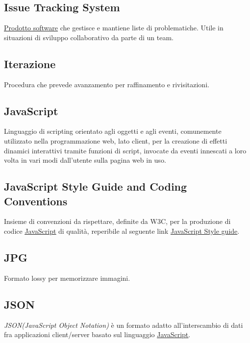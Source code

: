	\subsection{Issue Tracking System}
	\label{sec:issuetrack}
	\underline{\hyperref[sec:prodottosoftware]{Prodotto software}} che gestisce e mantiene liste di problematiche. Utile in situazioni di sviluppo collaborativo da parte di un team.


	\subsection{Iterazione}
	\label{sec:iterazione}
	Procedura che prevede avanzamento per raffinamento e rivisitazioni.


	\newpage

	\subsection{JavaScript}
	\label{sec:javascript}
	Linguaggio di scripting orientato agli oggetti e agli eventi, comunemente utilizzato nella programmazione web, lato client, per la creazione di effetti dinamici interattivi tramite funzioni di script, invocate da eventi innescati a loro volta in vari modi dall'utente sulla pagina web in uso.
	\subsection{JavaScript Style Guide and Coding Conventions}
	\label{sec:JavaScriptSGAC}
	Insieme di convenzioni da rispettare, definite da W3C, per la produzione di codice \underline{\hyperref[sec:javascript]{JavaScript}} di qualità, reperibile al seguente link \href{https://www.w3schools.com/js/js_conventions.asp}{JavaScript Style guide}.
	\subsection{JPG}
	\label{sec:jpg}
	Formato lossy per memorizzare immagini.


	\subsection{JSON}
	\label{sec:json}
	\emph{JSON(JavaScript Object Notation)} è un formato adatto all'interscambio di dati fra applicazioni client/server basato sul linguaggio \underline{\hyperref[sec:javascript]{JavaScript}}.


